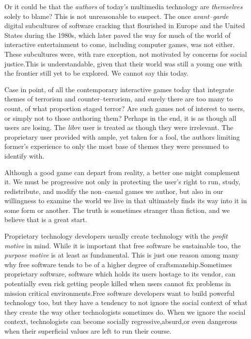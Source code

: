 Or it could be that the {\it authors} of today's multimedia technology are {\it themselves} solely to blame? This is not unreasonable to suspect. The once {\it avant--garde} digital subcultures of software cracking that flourished in Europe and the United States during the 1980s, which later paved the way for much of the world of interactive entertainment to come, including computer games, was not either. These subcultures were, with rare exception, not motivated by concerns for social justice.\footnotecite[extras={, p.~18.}][wasiak2012] This is understandable, given that their world was still a young one with the frontier still yet to be explored. We cannot say this today.

Case in point, of all the contemporary interactive games today that integrate themes of terrorism and counter--terrorism, and surely there are too many to count, of what proportion staged terror? Are such games not of interest to users, or simply not to those authoring them? Perhaps in the end, it is as though all users are losing. The {\it libre} user is treated as though they were irrelevant. The proprietary user provided with ample, yet taken for a fool, the authors limiting former's experience to only the most base of themes they were presumed to identify with.

Although a good game can depart from reality, a better one might complement it. We must be progressive not only in protecting the user's right to run, study, redistribute, and modify the non--casual games we author, but also in our willingness to examine the world we live in that ultimately finds its way into it in some form or another. The truth is sometimes stranger than fiction, and we believe that is a great start.

Proprietary technology developers usually create technology with the {\it profit motive} in mind. While it is important that free software be sustainable too, the {\it purpose motive} is at least as fundamental. This is just one reason among many why free software tends to be of a higher degree of craftsmanship. Sometimes proprietary software, software which holds its users hostage to its vendor, can potentially even risk getting people killed when users cannot fix problems in mission critical environments. Free software developers want to build powerful technology too, but they have a tendency to not ignore the social context of what they create the way other technologists sometimes do. When we ignore the social context, technologists can become socially regressive, absurd, or even dangerous when their superficial values are left to run their course.\footnotecite[black2012]\footnotecite[brew2012]

